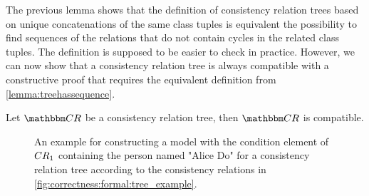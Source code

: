 The previous lemma shows that the definition of consistency relation trees based on unique concatenations of the same class tuples is equivalent the possibility to find sequences of the relations that do not contain cycles in the related class tuples. %
The definition is supposed to be easier to check in practice.
However, we can now show that a consistency relation tree is always compatible with a constructive proof that requires the equivalent definition from \autoref{lemma:treehassequence}.


\begin{theorem} \label{theorem:treecompatibility}
    Let $\consistencyrelationset{CR}$ be a consistency relation tree, then $\consistencyrelationset{CR}$ is compatible.
\end{theorem}

\begin{figure}
    \centering
    
    \caption{An example for constructing a model with the condition element of $CR_{1}$ containing the person named "Alice Do" for a consistency relation tree according to the consistency relations in \autoref{fig:correctness:formal:tree_example}.}
    \label{fig:correctness:formal:tree_construction_example}
\end{figure}

